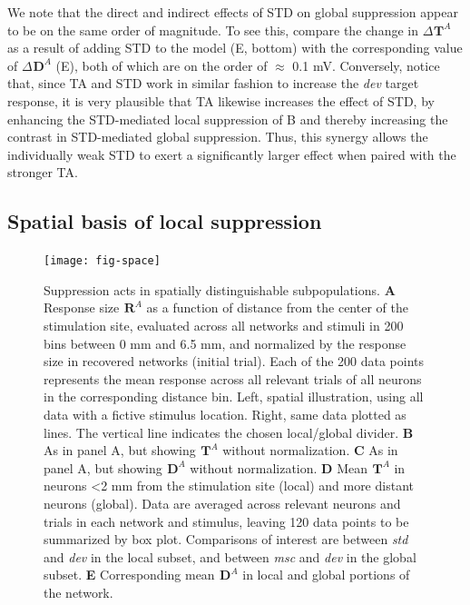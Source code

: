 \documentclass[9pt,lineno,onehalfspacing]{elife}
\newcommand{\dev}{\textit{dev}}
\newcommand{\msc}{\textit{msc}}
\newcommand{\std}{\textit{std}}
\newcommand{\R}[3][]{{}^{#1}_{}\boldsymbol R^{#2}_{#3}}
\newcommand{\T}[3][]{{}^{#1}_{}\boldsymbol T^{#2}_{#3}}
\newcommand{\D}[3][]{{}^{#1}_{}\boldsymbol D^{#2}_{#3}}
\begin{document}
We note that the direct and indirect effects of STD on global suppression appear to be on the same order of magnitude. To see this, compare the change in $\Delta \T{A}{}$ as a result of adding STD to the model (E, bottom) with the corresponding value of $\Delta \D{A}{}$ (E), both of which are on the order of $\approx$ 0.1 mV. Conversely, notice that, since TA and STD work in similar fashion to increase the \dev{} target response, it is very plausible that TA likewise increases the effect of STD, by enhancing the STD-mediated local suppression of B and thereby increasing the contrast in STD-mediated global suppression. Thus, this synergy allows the individually weak STD to exert a significantly larger effect when paired with the stronger TA.

\subsection{Spatial basis of local suppression}

\begin{figure}
    \texttt{[image: fig-space]}
    \caption{%
        Suppression acts in spatially distinguishable subpopulations.
        \textbf{A} Response size $\R{A}{}$ as a function of distance from the center of the stimulation site, evaluated across all networks and stimuli in 200 bins between 0 mm and 6.5 mm, and normalized by the response size in recovered networks (initial trial). Each of the 200 data points represents the mean response across all relevant trials of all neurons in the corresponding distance bin. Left, spatial illustration, using all data with a fictive stimulus location. Right, same data plotted as lines. The vertical line indicates the chosen local/global divider.
        \textbf{B} As in panel A, but showing $\T{A}{}$ without normalization.
        \textbf{C} As in panel A, but showing $\D{A}{}$ without normalization.
        \textbf{D} Mean $\T{A}{}$ in neurons <2 mm from the stimulation site (local) and more distant neurons (global). Data are averaged across relevant neurons and trials in each network and stimulus, leaving 120 data points to be summarized by box plot. Comparisons of interest are between \std{} and \dev{} in the local subset, and between \msc{} and \dev{} in the global subset.
        \textbf{E} Corresponding mean $\D{A}{}$ in local and global portions of the network.
    }
    \label{fig:space}
\end{figure}
\end{document}
